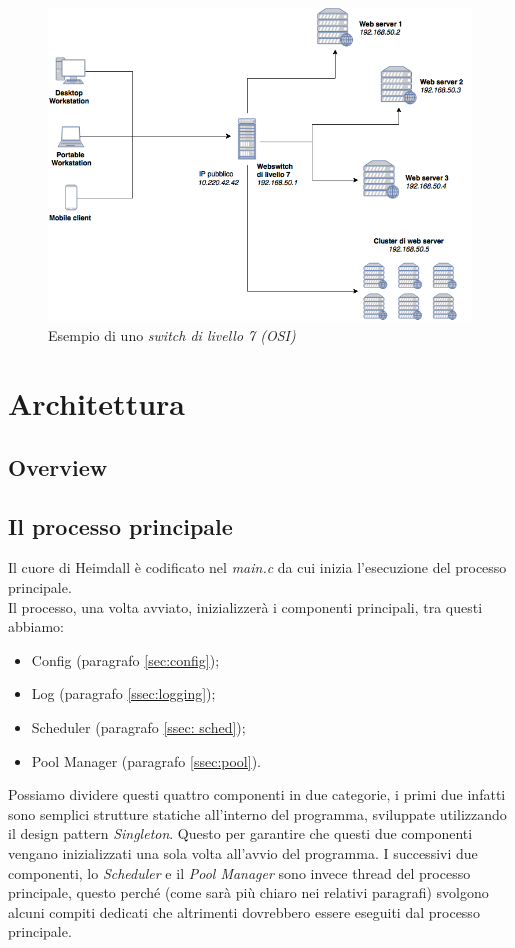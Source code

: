 \documentclass[italian]{tktltiki2}
\begin{document}
\begin{figure}
\centering
\includegraphics[width=\textwidth]{images/switch7}
\caption{Esempio di uno \emph{switch di livello 7 (OSI)}}
\end{figure}

\newpage
\section{Architettura}
\label{sec:architecture}

\subsection{Overview}
\label{ssec:overview}

\subsection{Il processo principale}
\label{ssec:main_process}
Il cuore di Heimdall è codificato nel \emph{main.c} da cui inizia l'esecuzione del processo principale.
\\
Il processo, una volta avviato, inizializzerà i componenti principali, tra questi abbiamo:

\begin{itemize}
  \item Config (paragrafo \ref{sec:config});
  \item Log (paragrafo \ref{ssec:logging});
  \item Scheduler (paragrafo \ref{ssec: sched});
  \item Pool Manager (paragrafo \ref{ssec:pool}).
\end{itemize}
Possiamo dividere questi quattro componenti in due categorie, i primi due infatti sono semplici strutture statiche all'interno del programma, sviluppate utilizzando il design pattern \emph{Singleton}. Questo per garantire che questi due componenti vengano inizializzati una sola volta all'avvio del programma. I successivi due componenti, lo \emph{Scheduler} e il \emph{Pool Manager} sono invece thread del processo principale, questo perché (come sarà più chiaro nei relativi paragrafi) svolgono alcuni compiti dedicati che altrimenti dovrebbero essere eseguiti dal processo principale.
\end{document}
